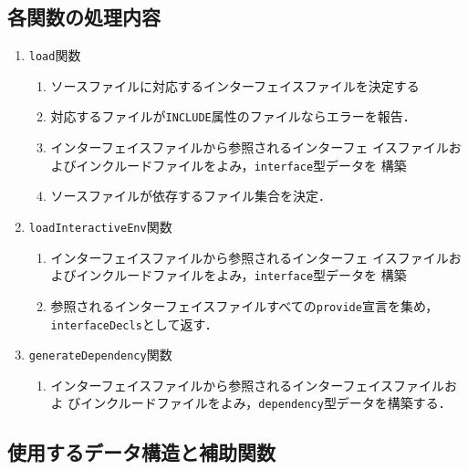 \documentclass{jbook}
\newcommand{\code}[1]{\mbox{\large\tt #1}}
\begin{document}
\subsection{各関数の処理内容}
\begin{enumerate}
\item \code{load}関数
\begin{enumerate}
\item ソースファイルに対応するインターフェイスファイルを決定する
\item 対応するファイルが\code{INCLUDE}属性のファイルならエラーを報告．
\item インターフェイスファイルから参照されるインターフェ
イスファイルおよびインクルードファイルをよみ，\code{interface}型データを
構築
\item ソースファイルが依存するファイル集合を決定．
\end{enumerate}
	
\item \code{loadInteractiveEnv}関数
\begin{enumerate}
\item インターフェイスファイルから参照されるインターフェ
イスファイルおよびインクルードファイルをよみ，\code{interface}型データを
構築
\item 参照されるインターフェイスファイルすべての\code{provide}宣言を集め，
\code{interfaceDecls}として返す．
\end{enumerate}

\item \code{generateDependency}関数
\begin{enumerate}
\item インターフェイスファイルから参照されるインターフェイスファイルおよ
びインクルードファイルをよみ，\code{dependency}型データを構築する．
\end{enumerate}
\end{enumerate}

\subsection{使用するデータ構造と補助関数}
\end{document}
